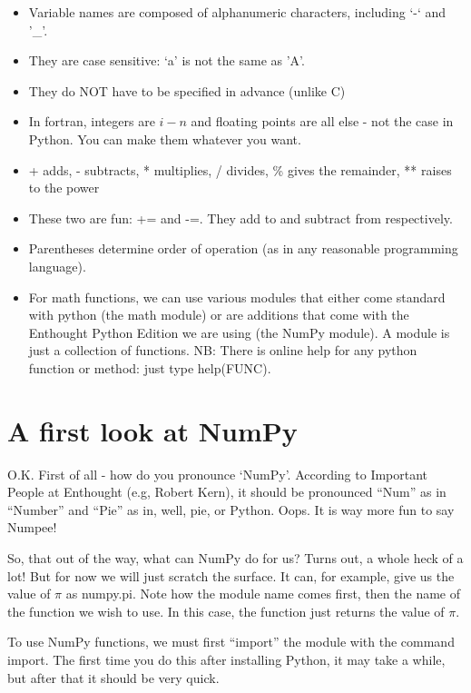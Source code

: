 \documentclass[11pt]{book}
\begin{document}
{\begin{itemize}
\item Variable names are composed of alphanumeric characters, including `-` and '\_'.
\item They are case sensitive:  `a' is not the same as 'A'.
\item They do NOT have to be specified in advance (unlike C)
\item In fortran, integers are  $i-n$ and floating points are all else - not the case in Python. You can make them whatever you want.
\item + adds, - subtracts, * multiplies, / divides, \% gives the remainder, ** raises to the power
\item These two are fun: {\color{blue}+=} and  {\color{blue}-=}.  They add to and subtract from respectively.
\item Parentheses determine order of operation (as in any reasonable programming language).
\item  For math functions, we can use various modules that either come standard with python (the math module) or are additions that come with the Enthought Python Edition we are using (the NumPy module).  A module is just a collection of functions. NB:  There is online help for any python function or method:  just type help(FUNC).
\end{itemize}


\section{A first look at NumPy}

O.K.  First of all - how do you pronounce `NumPy'.  According to Important People at Enthought (e.g, Robert Kern), it should be pronounced ``Num'' as in ``Number'' and ``Pie'' as in, well, pie, or Python.  Oops.  It is way more fun to say Numpee!

So, that out of the way, what can NumPy do for us?  Turns out, a whole heck of a lot!  But for now we will just scratch the surface.   It can, for example, give us the value of $\pi$ as {\color{blue}numpy.pi}.  Note how the module name comes first, then the name of the function we wish to use.  In this case, the function just returns the value of $\pi$.

To use {\color{blue}NumPy} functions, we must first ``import'' the module with the command {\color{blue}import}.  The first time you do this after installing Python, it may take a while, but after that it should be very quick.

}
\end{document}
